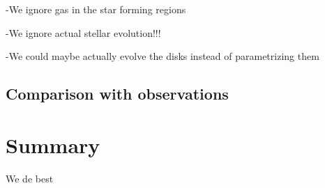 \documentclass[fleqn,usenatbib]{mnras}
\begin{document}
-We ignore gas in the star forming regions

-We ignore actual stellar evolution!!!

-We could maybe actually evolve the disks instead of parametrizing them

\subsection{Comparison with observations}

\section{Summary}
\label{sec:summary}

We de best

\bsp	%


\label{lastpage}
\end{document}
